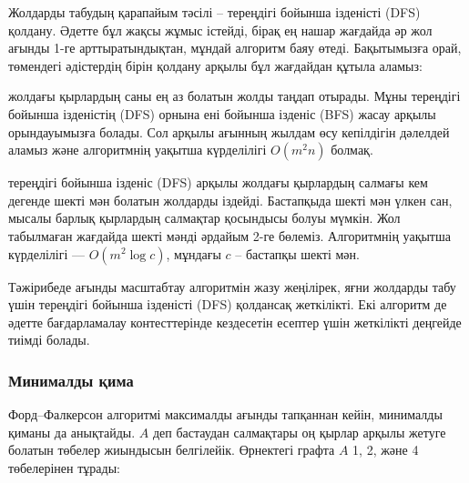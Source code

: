 Жолдарды табудың қарапайым тәсілі -- 
тереңдігі бойынша ізденісті (DFS) қолдану.
Әдетте бұл жақсы жұмыс істейді, бірақ ең нашар жағдайда
әр жол ағынды 1-ге арттыратындықтан, мұндай алгоритм
баяу өтеді. Бақытымызға орай, төмендегі әдістердің 
бірін қолдану арқылы бұл жағдайдан құтыла аламыз:


 \cite{edm72}
жолдағы қырлардың саны ең аз болатын
жолды таңдап отырады. Мұны тереңдігі бойынша ізденістің
(DFS) орнына ені бойынша ізденіс (BFS) жасау арқылы орындауымызға
болады. Сол арқылы ағынның жылдам өсу кепілдігін 
дәлелдей аламыз және алгоритмнің уақытша күрделілігі 
$O(m^2 n)$ болмақ.


 \cite{ahu91} 
тереңдігі бойынша ізденіс (DFS) арқылы
жолдағы қырлардың салмағы кем дегенде шекті 
мән болатын жолдарды іздейді. Бастапқыда
шекті мән үлкен сан, мысалы
барлық қырлардың салмақтар қосындысы болуы мүмкін.
Жол табылмаған жағдайда шекті мәнді әрдайым
2-ге бөлеміз. Алгоритмнің уақытша күрделілігі ––
$O(m^2 \log c)$, мұндағы $c$ -- бастапқы шекті мән. 

Тәжірибеде ағынды масштабтау алгоритмін жазу жеңілірек, яғни 
жолдарды табу үшін тереңдігі бойынша ізденісті (DFS) қолдансақ жеткілікті.
Екі алгоритм де әдетте 
бағдарламалау контесттерінде
кездесетін есептер үшін 
жеткілікті деңгейде тиімді болады.

\subsubsection{Минималды қима}


Форд–Фалкерсон алгоритмі максималды ағынды тапқаннан кейін, 
минималды қиманы да анықтайды. 
$A$ деп бастаудан салмақтары оң қырлар арқылы
жетуге болатын төбелер жиындысын белгілейік. 
Өрнектегі графта $A$ 1, 2, және 4 төбелерінен тұрады:

